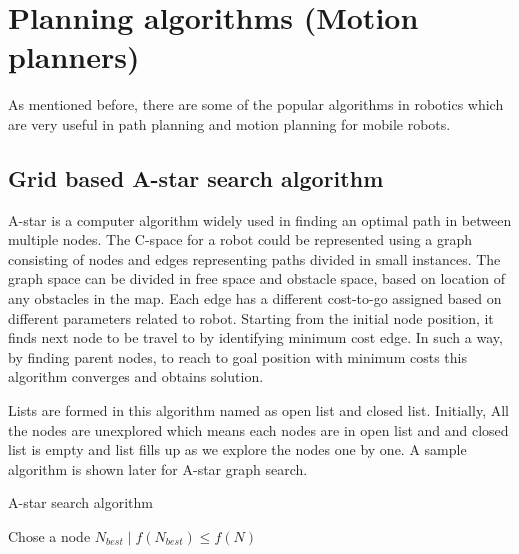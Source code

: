 \documentclass[12pt]{article}
\begin{document}
\section{Planning algorithms (Motion planners)}
As mentioned before, there are some of the popular algorithms in robotics which are very useful in path planning and motion planning for mobile robots. 
\subsection{Grid based A-star search algorithm}
A-star is a computer algorithm widely used in finding an optimal path in between multiple nodes. The C-space for a robot could be represented using a graph consisting of nodes and edges representing paths divided in small instances. The graph space can be divided in free space and obstacle space, based on location of any obstacles in the map. Each edge has a different cost-to-go assigned based on different parameters related to robot. Starting from the initial node position, it finds next node to be travel to by identifying minimum cost edge. In such a way, by finding parent nodes, to reach to goal position with minimum costs this algorithm converges and obtains solution.   
\par \noindent
Lists are formed in this algorithm named as open list and closed list. Initially, All the nodes are unexplored which means each nodes are in open list and and closed list is empty and list fills up as we explore the nodes one by one. A sample algorithm is shown later for A-star graph search.
\begin{algorithm}[ht]
\caption{A-star search algorithm}
\begin{algorithmic}[1]
\State Chose a node  $N_{best} \mid  f(N_{best}) \leq f(N)$ 
 
 
\Else
{}
\EndIf
\EndFor
\EndWhile
\EndWhile
\end{algorithmic}
\end{algorithm}
\end{document}
